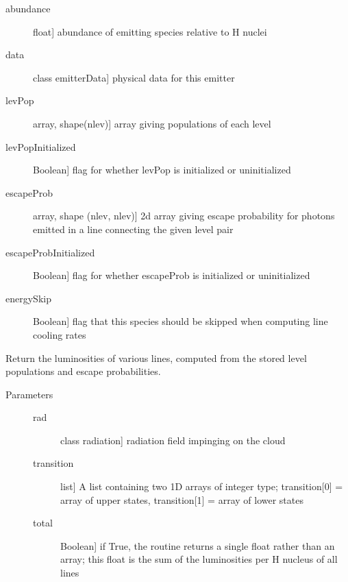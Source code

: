 \documentclass[letterpaper,10pt,english]{sphinxmanual}
\begin{document}
\begin{fulllineitems}
\begin{description}
\begin{description}
\item[{abundance}] \leavevmode{[}float{]}
abundance of emitting species relative to H nuclei

\item[{data}] \leavevmode{[}class emitterData{]}
physical data for this emitter

\item[{levPop}] \leavevmode{[}array, shape(nlev){]}
array giving populations of each level

\item[{levPopInitialized}] \leavevmode{[}Boolean{]}
flag for whether levPop is initialized or uninitialized

\item[{escapeProb}] \leavevmode{[}array, shape (nlev, nlev){]}
2d array giving escape probability for photons emitted in a
line connecting the given level pair

\item[{escapeProbInitialized}] \leavevmode{[}Boolean{]}
flag for whether escapeProb is initialized or uninitialized

\item[{energySkip}] \leavevmode{[}Boolean{]}
flag that this species should be skipped when computing line
cooling rates

\end{description}

\end{description}

\begin{fulllineitems}
\label{fulldoc:despotic.emitter.luminosityPerH}
Return the luminosities of various lines, computed from the
stored level populations and escape probabilities.
\begin{description}
\item[{Parameters}] \leavevmode\begin{description}
\item[{rad}] \leavevmode{[}class radiation{]}
radiation field impinging on the cloud

\item[{transition}] \leavevmode{[}list{]}
A list containing two 1D arrays of integer type;
transition{[}0{]} = array of upper states, transition{[}1{]} =
array of lower states

\item[{total}] \leavevmode{[}Boolean{]}
if True, the routine returns a single float rather than an
array; this float is the sum of the luminosities per H
nucleus of all lines


\end{description}
\end{description}
\end{fulllineitems}
\end{fulllineitems}
\end{document}
